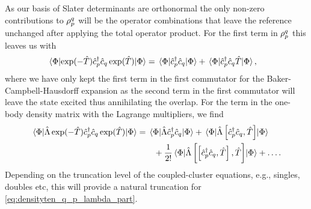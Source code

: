     As our basis of Slater determinants are orthonormal the only non-zero
    contributions to $\rho^q_p$ will be the operator combinations that
    leave the reference unchanged after applying the total operator product.
    For the first term in $\rho^q_p$ this leaves us with
    \begin{align}
        \mel*{\slat}{
            \exponential(-\clust)
            \ccr{p}\can{q}
            \exponential(\clust)
        }{\slat}
        &= \mel*{\slat}{
            \ccr{p}\can{q}
        }{\slat}
        + \mel*{\slat}{
            \ccr{p}\can{q}\clust
        }{\slat},
    \end{align}
    where we have only kept the first term in the first commutator for the
    Baker-Campbell-Hausdorff expansion as the second term in the first
    commutator will leave the state excited thus annihilating the overlap.
    For the term in the one-body density matrix with the Lagrange multipliers,
    we find
    \begin{align}
        \mel*{\slat}{
            \clustl
            \exponential(-\clust)
            \ccr{p}\can{q}
            \exponential(\clust)
        }{\slat}
        &= \mel*{\slat}{
            \clustl
            \ccr{p}\can{q}
        }{\slat}
        + \mel*{\slat}{
            \clustl
            \com{\ccr{p}\can{q}}{\clust}
        }{\slat}
        \nonumber \\
        &\qquad
        + \frac{1}{2!}
        \mel*{\slat}{
            \clustl
            \com{\com{\ccr{p}\can{q}}{\clust}}{\clust}
        }{\slat}
        + \dots.
        \label{eq:densityten_q_p_lambda_part}
    \end{align}
    Depending on the truncation level of the coupled-cluster equations, e.g.,
    singles, doubles etc, this will provide a natural truncation for
    \autoref{eq:densityten_q_p_lambda_part}.

